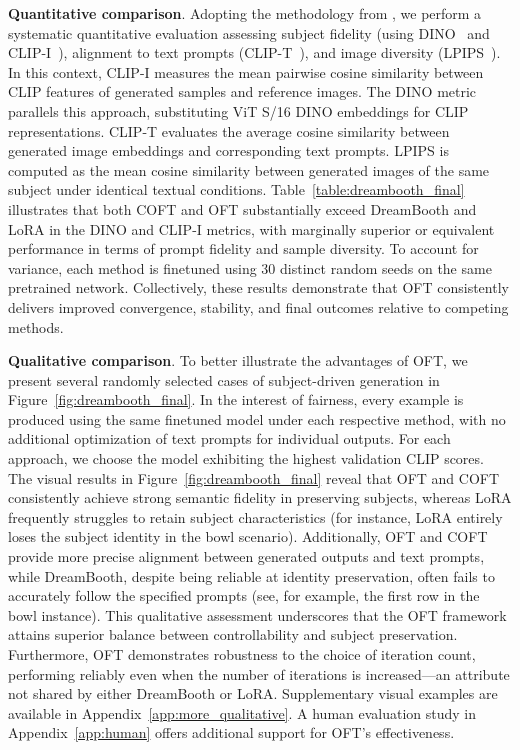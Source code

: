{\textbf{Quantitative comparison}. Adopting the methodology from \cite{ruiz2023dreambooth}, we perform a systematic quantitative evaluation assessing subject fidelity (using DINO~\cite{caron2021emerging} and CLIP-I~\cite{radford2021learning}), alignment to text prompts (CLIP-T~\cite{radford2021learning}), and image diversity (LPIPS~\cite{zhang2018unreasonable}). In this context, CLIP-I measures the mean pairwise cosine similarity between CLIP features of generated samples and reference images. The DINO metric parallels this approach, substituting ViT S/16 DINO embeddings for CLIP representations. CLIP-T evaluates the average cosine similarity between generated image embeddings and corresponding text prompts. LPIPS is computed as the mean cosine similarity between generated images of the same subject under identical textual conditions. Table~\ref{table:dreambooth_final} illustrates that both COFT and OFT substantially exceed DreamBooth and LoRA in the DINO and CLIP-I metrics, with marginally superior or equivalent performance in terms of prompt fidelity and sample diversity. To account for variance, each method is finetuned using 30 distinct random seeds on the same pretrained network. Collectively, these results demonstrate that OFT consistently delivers improved convergence, stability, and final outcomes relative to competing methods.

\textbf{Qualitative comparison}. To better illustrate the advantages of OFT, we present several randomly selected cases of subject-driven generation in Figure~\ref{fig:dreambooth_final}. In the interest of fairness, every example is produced using the same finetuned model under each respective method, with no additional optimization of text prompts for individual outputs. For each approach, we choose the model exhibiting the highest validation CLIP scores. The visual results in Figure~\ref{fig:dreambooth_final} reveal that OFT and COFT consistently achieve strong semantic fidelity in preserving subjects, whereas LoRA frequently struggles to retain subject characteristics (for instance, LoRA entirely loses the subject identity in the bowl scenario). Additionally, OFT and COFT provide more precise alignment between generated outputs and text prompts, while DreamBooth, despite being reliable at identity preservation, often fails to accurately follow the specified prompts (see, for example, the first row in the bowl instance). This qualitative assessment underscores that the OFT framework attains superior balance between controllability and subject preservation. Furthermore, OFT demonstrates robustness to the choice of iteration count, performing reliably even when the number of iterations is increased—an attribute not shared by either DreamBooth or LoRA. Supplementary visual examples are available in Appendix~\ref{app:more_qualitative}. A human evaluation study in Appendix~\ref{app:human} offers additional support for OFT's effectiveness.

}
